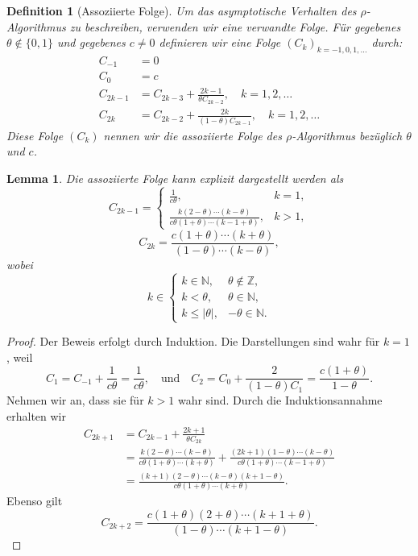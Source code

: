 \documentclass[a4paper,12pt]{article}
\numberwithin{equation}{section}
\newtheorem{lemma}[satz]{Lemma}
\newtheorem{definition}[satz]{Definition}
\theoremstyle{remark}
\begin{document}
\begin{definition}[Assoziierte Folge]\label{subsec:assoz}
\textnormal{Um das asymptotische Verhalten des $\rho$-Algorithmus zu beschreiben, verwenden wir eine verwandte Folge.} Für gegebenes $\theta \notin \big\{0,1\big\}$ und gegebenes $c \ne 0$ definieren wir eine Folge $(C_k)_{k=-1,0,1,\dots}$ durch:
\begin{align*}
C_{-1} &= 0 \\
C_0 &= c \\
C_{2k-1} &= C_{2k-3} + \frac{2k - 1}{\theta C_{2k-2}}, \quad k = 1, 2, \dots\\
C_{2k} &= C_{2k-2} + \frac{2k}{(1 - \theta) C_{2k-1}}, \quad k = 1, 2, \dots
\end{align*}
Diese Folge $(C_k)$ nennen wir die assoziierte Folge des $\rho$-Algorithmus bezüglich $\theta$ und $c$.
\end{definition}

\begin{lemma}\label{lemma}
Die assoziierte Folge kann explizit dargestellt werden als
\[
C_{2k-1} = 
\begin{cases}
\frac{1}{c\theta}, & k = 1, \\
\frac{k(2-\theta)\cdots(k-\theta)}{c\theta(1+\theta)\cdots(k-1+\theta)}, & k > 1,
\end{cases}
\]
\[
C_{2k} = \frac{c(1+\theta)\cdots(k+\theta)}{(1-\theta)\cdots(k-\theta)},
\]
wobei
\[
k \in 
\begin{cases}
k\in\mathbb{N}, & \theta \notin \mathbb{Z}, \\
k< \theta, & \theta \in \mathbb{N}, \\
k\leq |\theta|, & -\theta \in \mathbb{N}.
\end{cases}
\]
\end{lemma}

\begin{proof}
Der Beweis erfolgt durch Induktion. Die Darstellungen sind wahr für $k = 1$, weil 
\[
C_1 = C_{-1} + \frac{1}{c\theta} = \frac{1}{c\theta}, \quad \text{und} \quad 
C_2 = C_0 + \frac{2}{(1-\theta)C_1} = \frac{c(1+\theta)}{1-\theta}.
\]
Nehmen wir an, dass sie für $k > 1$ wahr sind. Durch die Induktionsannahme erhalten wir
\begin{align*}
C_{2k+1} &= C_{2k-1} + \frac{2k + 1}{\theta C_{2k}} \\
&= \frac{k(2-\theta)\cdots(k-\theta)}{c\theta(1+\theta)\cdots(k+\theta)} 
+ \frac{(2k+1)(1-\theta)\cdots(k-\theta)}{c\theta(1+\theta)\cdots(k-1+\theta)} \\
&= \frac{(k+1)(2-\theta)\cdots(k-\theta)(k+1-\theta)}{c\theta(1+\theta)\cdots(k+\theta)}.
\end{align*}
Ebenso gilt
\[
C_{2k+2} = \frac{c(1+\theta)(2+\theta)\cdots(k+1+\theta)}{(1-\theta)\cdots(k+1-\theta)}.
\]

\end{proof}
\end{document}
